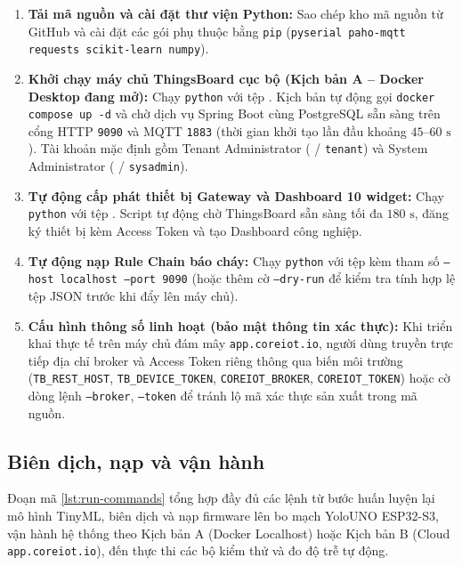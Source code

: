 \begin{enumerate}[leftmargin=*, itemsep=3pt]
  \item \textbf{Tải mã nguồn và cài đặt thư viện Python:}
  Sao chép kho mã nguồn từ GitHub và cài đặt các gói phụ thuộc bằng \texttt{pip} (\texttt{pyserial paho-mqtt requests scikit-learn numpy}).
  \item \textbf{Khởi chạy máy chủ ThingsBoard cục bộ (Kịch bản A -- Docker Desktop đang mở):}
  Chạy \texttt{python} với tệp . Kịch bản tự động gọi \texttt{docker compose up -d} và chờ dịch vụ Spring Boot cùng PostgreSQL sẵn sàng trên cổng HTTP \texttt{9090} và MQTT \texttt{1883} (thời gian khởi tạo lần đầu khoảng $45$--$60\text{ s}$). Tài khoản mặc định gồm Tenant Administrator ( / \texttt{tenant}) và System Administrator ( / \texttt{sysadmin}).
  \item \textbf{Tự động cấp phát thiết bị Gateway và Dashboard 10 widget:}
  Chạy \texttt{python} với tệp . Script tự động chờ ThingsBoard sẵn sàng tối đa $180\text{ s}$, đăng ký thiết bị  kèm Access Token và tạo Dashboard công nghiệp.
  \item \textbf{Tự động nạp Rule Chain báo cháy:}
  Chạy \texttt{python} với tệp  kèm tham số \texttt{--host localhost --port 9090} (hoặc thêm cờ \texttt{--dry-run} để kiểm tra tính hợp lệ tệp JSON trước khi đẩy lên máy chủ).
  \item \textbf{Cấu hình thông số linh hoạt (bảo mật thông tin xác thực):}
  Khi triển khai thực tế trên máy chủ đám mây \texttt{app.coreiot.io}, người dùng truyền trực tiếp địa chỉ broker và Access Token riêng thông qua biến môi trường (\texttt{TB\_REST\_HOST}, \texttt{TB\_DEVICE\_TOKEN}, \texttt{COREIOT\_BROKER}, \texttt{COREIOT\_TOKEN}) hoặc cờ dòng lệnh \texttt{--broker}, \texttt{--token} để tránh lộ mã xác thực sản xuất trong mã nguồn.
\end{enumerate}

\subsection{Biên dịch, nạp và vận hành}
\label{subsec:bien-dich-van-hanh}

Đoạn mã \ref{lst:run-commands} tổng hợp đầy đủ các lệnh từ bước huấn luyện lại mô hình TinyML, biên dịch và nạp firmware lên bo mạch YoloUNO ESP32-S3, vận hành hệ thống theo Kịch bản A (Docker Localhost) hoặc Kịch bản B (Cloud \texttt{app.coreiot.io}), đến thực thi các bộ kiểm thử và đo độ trễ tự động.

